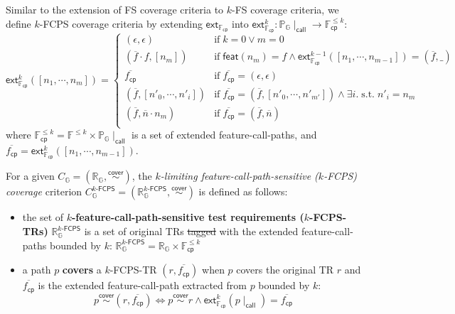 \documentclass[acmsmall,review,screen]{acmart}
\newcommand{\tif}{\text{if} \; }
\newcommand{\tst}{{\; \text{s.t.} \; }}
\newcommand{\name}[1]{\textsf{#1}}
\newcommand{\graph}{\mathbb{G}}
\newcommand{\node}{n}
\newcommand{\nodes}{\overline{\node}} %
\newcommand{\patset}[1]{\mathbb{P}_{#1}}
\newcommand{\pat}{p}
\newcommand{\cover}{\overset{\name{cover}}{\sim}}
\newcommand{\trset}[1]{\mathbb{R}_{#1}}
\newcommand{\tr}{r}
\newcommand{\cov}[1]{C_{#1}}
\newcommand{\featset}{\mathbb{F}}
\newcommand{\feat}{f}
\newcommand{\feats}{\overline{\feat}} %
\newcommand{\featmap}{\name{feat}}
\newcommand{\css}[1]{{#1}\!\mid_{\name{call}}}
\newcommand{\fcpset}{\featset_\name{cp}}
\newcommand{\fcp}{\feat_\name{cp}}
\newcommand{\fcps}{\overline{\fcp}} %
\newcommand{\extfcp}{\name{ext}_{\fcpset}}
\newcommand{\extfcps}[1]{\extfcp^{#1}}
\newcommand{\kfcpcov}[2]{\cov{#2}^{{#1}\name{-FCPS}}}
\newcommand{\kfcptrset}[2]{\trset{#2}^{{#1}\name{-FCPS}}}
\providecommand{\DIFdeltex}[1]{{\protect\color{red}\sout{#1}}}                      %
\providecommand{\DIFdelbegin}{} %
\providecommand{\DIFdelend}{} %
\providecommand{\DIFdel}[1]{\texorpdfstring{\DIFdeltex{#1}}{}} %
\newcommand{\DIFscaledelfig}{0.5}
\newlength{\DIFdelgraphicswidth} %
\newlength{\DIFdelgraphicsheight} %
\newcommand{\DIFdelincludegraphics}[2][]{%
\sbox{\DIFdelgraphicsbox}{\DIFOincludegraphics[#1]{#2}}%
\settoboxwidth{\DIFdelgraphicswidth}{\DIFdelgraphicsbox} %
\settoboxtotalheight{\DIFdelgraphicsheight}{\DIFdelgraphicsbox} %
\scalebox{\DIFscaledelfig}{%
\parbox[b]{\DIFdelgraphicswidth}{\usebox{\DIFdelgraphicsbox}\\[-\baselineskip] \rule{\DIFdelgraphicswidth}{0em}}\llap{\resizebox{\DIFdelgraphicswidth}{\DIFdelgraphicsheight}{%
\setlength{\unitlength}{\DIFdelgraphicswidth}%
\begin{picture}(1,1)%
\thicklines\linethickness{2pt} %
{\color[rgb]{1,0,0}\put(0,0){\framebox(1,1){}}}%
{\color[rgb]{1,0,0}\put(0,0){\line( 1,1){1}}}%
{\color[rgb]{1,0,0}\put(0,1){\line(1,-1){1}}}%
\end{picture}%
}\hspace*{3pt}}} %
} %
\DeclareRobustCommand{\DIFdelbegin}{\DIFOdelbegin \let\includegraphics\DIFdelincludegraphics} %
\DeclareRobustCommand{\DIFdelend}{\DIFOaddend \let\includegraphics\DIFOincludegraphics} %
\begin{document}
Similar to the extension of FS coverage criteria to $k$-FS coverage criteria,
we define $k$-FCPS coverage criteria by extending $\extfcp$ into $\extfcps{k}:
\css{\patset{\graph}} \rightarrow \fcpset^{\leq k}$:
%
\begin{equation}\label{equ:extfcps}
  \extfcps{k}([\node_1, \cdots, \node_m]) = \left\{
    \begin{array}{ll}
      (\epsilon, \epsilon) & \tif k = 0 \vee m = 0\\

      (\feats \cdot \feat, [\node_m]) & \tif \featmap(\node_m) = \feat \wedge
      \extfcps{k-1}([\node_1, \cdots, \node_{m-1}]) = (\feats, \_)\\

      \fcps & \tif \fcps = (\epsilon, \epsilon)\\

      (\feats, [\node'_0, \cdots, \node'_i]) &
      \tif \fcps = (\feats, [\node'_0, \cdots, \node'_{m'}]) \wedge
      \exists i. \tst \node'_i = \node_m\\

      (\feats, \nodes \cdot \node_m) & \tif \fcps = (\feats, \nodes)\\
    \end{array}
  \right.
\end{equation}
%
where $\fcpset^{\leq k} = \featset^{\leq k} \times \css{\patset{\graph}}$ is a
set of extended feature-call-paths, and $\fcps = \extfcps{k}([\node_1, \cdots,
\node_{m-1}])$.


\begin{definition}\label{def:k-fcps-cov}
  For a given $\cov{\graph} = (\trset{\graph}, \cover)$, the
  \textit{$k$-limiting feature-call-path-sensitive ($k$-FCPS) coverage}
  criterion $\kfcpcov{k}{\graph} = (\kfcptrset{k}{\graph}, \cover)$ is defined
  as follows:
  \begin{itemize}
    \item the set of \textbf{$k$-feature-call-path-sensitive test requirements
      ($k$-FCPS-TRs)} $\kfcptrset{k}{\graph}$ is a set of original TRs \DIFdelbegin \DIFdel{tagged
      }\DIFdelend with the
      extended feature-call-paths bounded by $k$:
$
        \kfcptrset{k}{\graph} = \trset{\graph} \times \fcpset^{\leq k}
$
    \item a path $\pat$ \textbf{covers} a $k$-FCPS-TR $(\tr, \fcps)$ when $\pat$
      covers the original TR $\tr$ and $\fcps$ is the extended feature-call-path
extracted from $\pat$ bounded by $k$:
\[
        \pat \cover (\tr, \fcps) \iff \pat \cover \tr \wedge
        \extfcps{k}(\css{\pat}) = \fcps
\]
  \end{itemize}
\end{definition}
\end{document}
